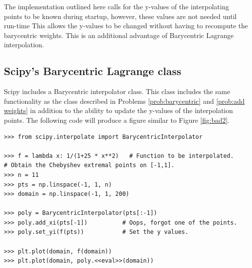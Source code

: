 The implementation outlined here calls for the y-values of the interpolating points to be known during startup, however, these values are not needed until run-time
This allows the y-values to be changed without having to recompute the barycentric weights.
This is an additional advantage of Barycentric Lagrange interpolation.

\subsection*{Scipy's Barycentric Lagrange class}
Scipy includes a Barycentric interpolator class.
This class includes the same functionality as the class described in Problems \ref{prob:barycentric} and \ref{prob:add weights} in addition to the ability to update the y-values of the interpolation points.
The following code will produce a figure similar to Figure \ref{fig:bad2}.
\begin{lstlisting}
>>> from scipy.interpolate import BarycentricInterpolator

>>> f = lambda x: 1/(1+25 * x**2)   # Function to be interpolated.
# Obtain the Chebyshev extremal points on [-1,1].
>>> n = 11
>>> pts = np.linspace(-1, 1, n)
>>> domain = np.linspace(-1, 1, 200)

>>> poly = BarycentricInterpolator(pts[:-1])
>>> poly.add_xi(pts[-1])          # Oops, forgot one of the points.
>>> poly.set_yi(f(pts))           # Set the y values.

>>> plt.plot(domain, f(domain))
>>> plt.plot(domain, poly.<<eval>>(domain))
\end{lstlisting}

